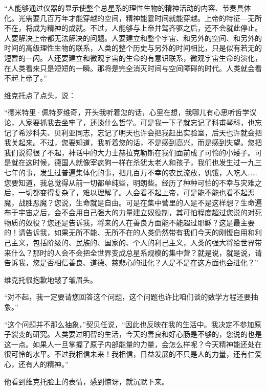“人能够通过仪器的显示使整个总星系的理性生物的精神活动的内容、节奏具体化。光需要几百万年才能穿越的空间，精神能霎时间就能穿越。上帝的特征—无所不在，将成为精神的成就。不过，人能够与上帝并驾齐驱之后，还不会就此停止。人要解决上帝都无法解决的问题。人要建立和整个宇宙、和另外的空间、和另外的时间的高级理性生物的联系，人类的整个历史与另外的时间相比，只是似有若无的短暂的一闪。人还要建立和微观宇宙的生命的有意识联系，微观宇宙生命的演化，在人类看来只是短短的一瞬。那将是完全消灭时间与空间障碍的时代。人类就会看不起上帝了。”

维克托点了点头，说：

“德米特里·佩特罗维奇，开头我听着您的话，心里在想，我哪儿有心思听哲学议论，人家要抓我去坐牢了，还谈什么哲学。可是我一下子就忘记了科甫琴科，也忘记了希沙科夫、贝利亚同志，忘记了明天也许会把我赶出实验室，后天也许就会把我关起来。不过，您要知道，我听着您的话，不是感到高兴，而是感到失望。您把我们说得很了不起，神话中的大力士赫拉克勒斯在我们面前成了可怜的小矮子。可是就在这时候，德国人就像宰疯狗一样在杀犹太老人和孩子，我们也发生过一九三七年的事，发生过普遍集体化的事，把几百万不幸的农民流放，饥饿，人吃人……您要知道，我总觉得从前一切都单纯些，明朗些。经历了种种可怕的不幸与灾难之后，一切都变得复杂了，难以理解了。人会看不起上帝，可是能不能也看不起恶魔，战胜恶魔？您说，生命就是自由。可是在集中营里的人是不是这样想？生命遍布于宇宙之后，会不会用自己强大的力量建立奴役制，其可怕程度超过您说的对死物质的奴役？您还是告诉我，将来的人在善良方面能不能超过耶稣？这是最主要的！请告诉我，如果无所不能、无所不在的人类仍然带有我们今天的刚愎自用和利己主义，包括阶级的、民族的、国家的、个人的利己主义，人类的强大将给世界带来什么？那时的人会不会把全世界变成总星系规模的集中营？就是说，就是说，请告诉我，您是否相信善良、道德、慈悲心的进化？人是不是在这方面也会进化？”

维克托很抱歉地皱了皱眉头。

“对不起，我一定要请您回答这个问题，这个问题也许比咱们谈的数学方程还要抽象。”

“这个问题并不那么抽象，”契贝任说，“因此也反映在我的生活中。我决定不参加原子裂变的研究。人类要过明智的生活，今天的善良和好心肠是不够的，您说的也是这一点。如果人一旦掌握了原子内部能量的力量，会怎么样呢？今天精神能还处在很可怜的水平。不过我相信未来！我相信，日益发展的不只是人的力量，还有仁爱心，还有人的精神。”

他看到维克托脸上的表情，感到惊讶，就沉默下来。

